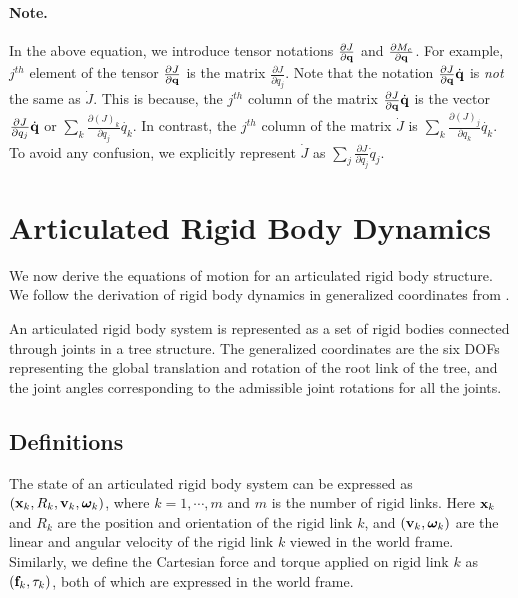\paragraph{Note.}
In the above equation, we introduce tensor notations $\frac{\partial J}{\partial \mathbf{q}}$ and $\frac{\partial M_c}{\partial \mathbf{q}}$. For example, $j^{th}$ element of the tensor $\frac{\partial J}{\partial \mathbf{q}}$ is the matrix $\frac{\partial J}{\partial {q}_j}$. Note that the notation $\frac{\partial J}{\partial \mathbf{q}} \dot{\mathbf{q}}$ is \emph{not} the same as $\dot{J}$. This is because, the $j^{th}$ column of the matrix $\frac{\partial J}{\partial \mathbf{q}} \dot{\mathbf{q}}$ is the vector $\frac{\partial J}{\partial q_j} \dot{\mathbf{q}}$ or $\sum_k \frac{\partial (J)_k}{\partial q_j} \dot{{q}_k}$. In contrast, the $j^{th}$ column of the matrix $\dot{J}$ is $\sum_k \frac{\partial (J)_j}{\partial q_k} \dot{{q}_k}$. To avoid any confusion, we explicitly represent $\dot{J}$ as $\sum_j \frac{\partial J}{\partial q_j} \dot{q}_j$.

\section{Articulated Rigid Body Dynamics}
We now derive the equations of motion for an articulated rigid body structure. We follow the derivation of rigid body dynamics in generalized coordinates from .

An articulated rigid body system is represented as a set of rigid bodies connected through joints in a tree structure. The generalized coordinates are the six DOFs representing the global translation and rotation of the root link of the tree, and the joint angles corresponding to the admissible joint rotations for all the joints. 

\subsection{Definitions}
The state of an articulated rigid body
system can be expressed as $(\mathbf{x}_k, R_k, \mathbf{v}_k,
\boldsymbol{\bm{\omega}}_k)$, where $k = 1, \cdots, m$ and $m$ is the number of rigid links. Here $\mathbf{x}_k$ and
$R_k$ are the position and orientation of the rigid link $k$, and $(\mathbf{v}_k,
{\bm{\omega}}_k)$ are the linear and angular velocity of the
rigid link $k$ viewed in the world frame. Similarly, we define the
Cartesian force and torque applied on rigid link $k$ as $(\mathbf{f}_k,
{\tau}_k)$, both of which are expressed in the world
frame.


